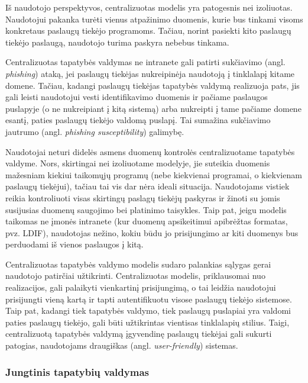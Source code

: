  
Iš naudotojo perspektyvos, centralizuotas modelis yra patogesnis nei izoliuotas. Naudotojui pakanka turėti vienus atpažinimo duomenis,
kurie bus tinkami visoms konkretaus paslaugų tiekėjo programoms. Tačiau, norint pasiekti kito paslaugų tiekėjo paslaugą,
naudotojo turima paskyra nebebus tinkama.

Centralizuotas tapatybės valdymas ne intranete gali patirti sukčiavimo (angl. \textit{phishing}) ataką, jei paslaugų tiekėjas nukreipinėja naudotoją į tinklalapį kitame domene. Tačiau,
kadangi paslaugų tiekėjas tapatybės valdymą realizuoja pats, jis gali leisti naudotojui vesti identifikavimo duomenis ir pačiame paslaugos puslapyje (o ne nukreipiant
į kitą sistemą) arba nukreipti į tame pačiame domene esantį, paties paslaugų tiekėjo valdomą puslapį. Tai sumažina sukčiavimo jautrumo (angl. \textit{phishing susceptibility}) galimybę.

Naudotojai neturi didelės asmens duomenų kontrolės centralizuotame tapatybės valdyme. Nors, skirtingai nei izoliuotame modelyje, jie suteikia duomenis mažesniam kiekiui taikomųjų programų
(nebe kiekvienai programai, o kiekvienam paslaugų tiekėjui), tačiau tai vis dar nėra ideali situacija. Naudotojams vistiek reikia kontroliuoti
visas skirtingų paslagų tiekėjų paskyras ir žinoti su jomis susijusias duomenų saugojimo bei platinimo taisykles. Taip pat, jeigu modelis taikomas ne įmonės intranete (kur
duomenų apsikeitimui apibrėžtas formatas, pvz. LDIF), naudotojas nežino, kokiu būdu jo prisijungimo ar kiti duomenys bus perduodami iš vienos paslaugos į kitą.

Centralizuotas tapatybės valdymo modelis sudaro palankias sąlygas gerai naudotojo patirčiai užtikrinti. Centralizuotas modelis, priklausomai nuo realizacijos,
gali palaikyti vienkartinį prisijungimą, o tai leidžia naudotojui prisijungti vieną kartą ir tapti autentifikuotu visose paslaugų tiekėjo sistemose. Taip pat, kadangi
tiek tapatybės valdymo, tiek paslaugų puslapiai yra valdomi paties paslaugų tiekėjo, gali būti užtikrintas vientisas tinklalapių stilius. Taigi, centralizuotą tapatybės valdymą
įgyvendinę paslaugų tiekėjai gali sukurti patogias, naudotojams draugiškas (angl. \textit{user-friendly}) sistemas.

\subsubsection{Jungtinis tapatybių valdymas}


